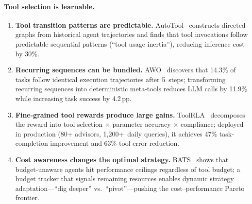 \begin{opportunity}
\paragraph{Tool selection is learnable.}
\begin{enumerate}[nosep]
  \item \textbf{Tool transition patterns are predictable.}
        AutoTool~\cite{autotool2025} constructs directed graphs from
        historical agent trajectories and finds that tool invocations
        follow predictable sequential patterns (``tool usage
        inertia''), reducing inference cost by 30\%.
  \item \textbf{Recurring sequences can be bundled.}
        AWO~\cite{awo2026} discovers that 14.3\% of tasks follow
        identical execution trajectories after 5~steps; transforming
        recurring sequences into deterministic meta-tools reduces LLM
        calls by 11.9\% while increasing task success by 4.2\,pp.
  \item \textbf{Fine-grained tool rewards produce large gains.}
        ToolRLA~\cite{toolrla2026} decomposes the reward into tool
        selection $\times$ parameter accuracy $\times$ compliance;
        deployed in production (80+ advisors, 1,200+~daily queries),
        it achieves 47\% task-completion improvement and 63\%
        tool-error reduction.
  \item \textbf{Cost awareness changes the optimal strategy.}
        BATS~\cite{bats2025} shows that budget-unaware agents hit
        performance ceilings regardless of tool budget; a budget
        tracker that signals remaining resources enables dynamic
        strategy adaptation---``dig deeper'' vs.\ ``pivot''---pushing
        the cost--performance Pareto frontier.
\end{enumerate}


\end{opportunity}

